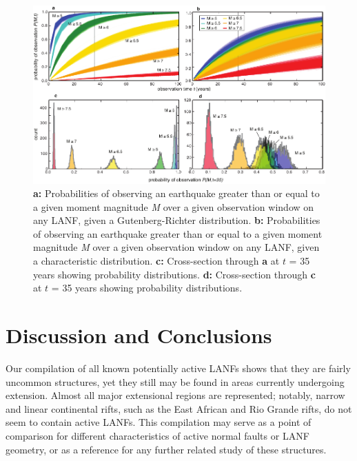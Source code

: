 \documentclass[twocolumn,grl]{AGUTeX}
\begin{document}
\begin{article}
\begin{figure}%
\noindent\includegraphics[width=40pc]{./figures/all_probs_2x2.pdf}
\caption{\textbf{a:} Probabilities of observing an earthquake greater than or 
equal to a given moment magnitude \emph{M} over a given observation window on 
any LANF, given a Gutenberg-Richter distribution. 
\textbf{b:} Probabilities of observing an earthquake greater than or 
equal to a given moment magnitude \emph{M} over a given observation window on 
any LANF, given a characteristic distribution. 
\textbf{c:} Cross-section through \textbf{a} at $t$ = 35 years
showing probability distributions.
\textbf{d:} Cross-section through \textbf{c} at $t$ = 35 years
showing probability distributions.}

\label{fig:all_probs}
\end{figure}

\section{Discussion and Conclusions}

Our compilation of all known potentially active LANFs shows that they 
are fairly uncommon structures, yet they still may be found in areas 
currently undergoing extension. Almost all major extensional regions are
represented; notably, narrow and linear continental rifts, such as 
the East African and Rio Grande rifts, do not seem to contain active LANFs.
This compilation may serve as a point of comparison for different
characteristics of active normal faults or LANF geometry, or as a
reference for any further related study of these structures.


\end{article}
\end{document}
